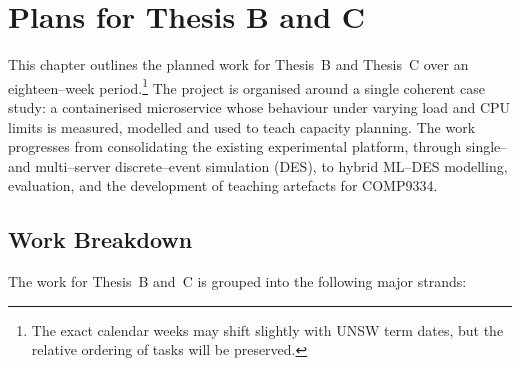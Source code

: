 \chapter{Plans for Thesis B and C}
\label{ch:projectplan}

This chapter outlines the planned work for Thesis~B and Thesis~C over an
eighteen--week period.\footnote{The exact calendar weeks may shift slightly
with UNSW term dates, but the relative ordering of tasks will be preserved.}
The project is organised around a single coherent case study: a
containerised microservice whose behaviour under varying load and CPU limits
is measured, modelled and used to teach capacity planning.  The work
progresses from consolidating the existing experimental platform, through
single-- and multi--server discrete--event simulation (DES), to hybrid
ML--DES modelling, evaluation, and the development of teaching artefacts for
COMP9334.

\section{Work Breakdown}

The work for Thesis~B and~C is grouped into the following major strands:

